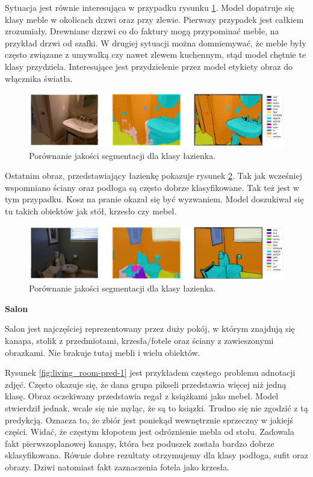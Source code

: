 Sytuacja jest równie interesująca w przypadku rysunku \ref{fig:bathroom-pred-2}. Model dopatruje się klasy meble w okolicach drzwi oraz przy zlewie. Pierwszy przypadek jest całkiem zrozumiały. Drewniane dzrzwi co do faktury mogą przypominać meble, na przykład drzwi od szafki. W drugiej sytuacji można domniemywać, że meble były często związane z umywalką czy nawet zlewem kuchennym, stąd model chętnie te klasy przydziela. Interesujące jest przydzielenie przez model etykiety obraz do włącznika światła.

\begin{figure}[ht!]
    \centering
    \includegraphics[width=\textwidth]{img/preds_analysis/gt_vs_pred/bathroom-2.png}
    \caption{Porównanie jakości segmentacji dla klasy łazienka.}
    \label{fig:bathroom-pred-2}
\end{figure}

Ostatnim obraz, przedstawiający łazienkę pokazuje rysunek \ref{fig:bathroom-pred-3}. Tak jak wcześniej wspomniano ściany oraz podłoga są często dobrze klasyfikowane. Tak też jest w tym przypadku. Kosz na pranie okazał się być wyzwaniem. Model doszukiwał się tu takich obiektów jak stół, krzesło czy mebel.
\begin{figure}[ht!]
    \centering
    \includegraphics[width=\textwidth]{img/preds_analysis/gt_vs_pred/bathroom-3.png}
    \caption{Porównanie jakości segmentacji dla klasy łazienka.}
    \label{fig:bathroom-pred-3}
\end{figure}

\noindent
\textbf{Salon}

Salon jest najczęściej reprezentowany przez duży pokój, w którym znajdują się kanapa, stolik z przedmiotami, krzesła/fotele oraz ściany z zawieszonymi obrazkami. Nie brakuje tutaj mebli i wielu obiektów.

Rysunek \ref{fig:living_room-pred-1} jest przykładem częstego problemu adnotacji zdjęć. Często okazuje się, że dana grupa pikseli przedstawia więcej niż jedną klasę. Obraz oczekiwany przedstawia regał z książkami jako mebel. Model stwierdził jednak, wcale się nie myląc, że są to ksiązki. Trudno się nie zgodzić z tą predykcją. Oznacza to, że zbiór jest poniekąd wewnętrznie sprzeczny w jakiejś części. Widać, że częstym kłopotem jest odróznienie mebla od stołu. Zadowala fakt pierwszoplanowej kanapy, która bez poduszek została bardzo dobrze sklasyfikowana. Równie dobre rezultaty otrzymujemy dla klasy podłoga, sufit oraz obrazy. Dziwi natomiast fakt zaznaczenia fotela jako krzesła.

